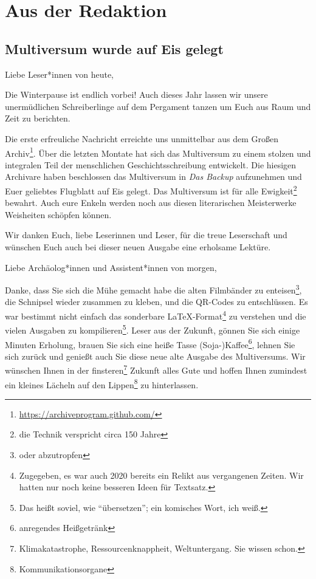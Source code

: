 \documentclass[final]{multiversum}
\begin{document}
\makemultititle
%

\section{Aus der Redaktion}
\subsection{Multiversum wurde auf Eis gelegt}
Liebe Leser*innen von heute, 

Die Winterpause ist endlich vorbei! Auch dieses Jahr lassen wir unsere unermüdlichen Schreiberlinge auf dem Pergament tanzen um Euch aus Raum und Zeit zu berichten. 

Die erste erfreuliche Nachricht erreichte uns unmittelbar aus dem Großen Archiv\footnote{\url{https://archiveprogram.github.com/}}. Über die letzten Montate hat sich das Multiversum zu einem stolzen und integralen Teil der menschlichen Geschichtsschreibung entwickelt. Die hiesigen Archivare haben beschlossen das Multiversum in \textit{Das Backup} aufzunehmen und Euer geliebtes Flugblatt auf Eis gelegt. 
Das Multiversum ist für alle Ewigkeit\footnote{die Technik verspricht circa 150 Jahre} bewahrt. Auch eure Enkeln werden noch aus diesen literarischen Meisterwerke Weisheiten schöpfen können.

Wir danken Euch, liebe Leserinnen und Leser, für die treue Leserschaft und wünschen Euch auch bei dieser neuen Ausgabe eine erholsame Lektüre.

\vspace{1em}\noindent
Liebe Archäolog*innen und Assistent*innen von morgen,

Danke, dass Sie sich die Mühe gemacht habe die alten Filmbänder zu enteisen\footnote{oder abzutropfen}, die Schnipsel wieder zusammen zu kleben, und die QR-Codes zu entschlüssen.
Es war bestimmt nicht einfach das sonderbare LaTeX-Format\footnote{Zugegeben, es war auch 2020 bereits ein Relikt aus vergangenen Zeiten. Wir hatten nur noch keine besseren Ideen für Textsatz.} zu verstehen und die vielen Ausgaben zu kompilieren\footnote{ Das heißt soviel, wie \enquote{übersetzen}; ein komisches Wort, ich weiß.}.
Leser aus der Zukunft, gönnen Sie sich einige Minuten Erholung, brauen Sie sich eine heiße Tasse (Soja-)Kaffee\footnote{anregendes Heißgetränk}, lehnen Sie sich zurück und genießt auch Sie diese neue alte Ausgabe des Multiversums.
Wir wünschen Ihnen in der finsteren\footnote{ Klimakatastrophe, Ressourcenknappheit, Weltuntergang. Sie wissen schon.} Zukunft alles Gute und hoffen Ihnen zumindest ein kleines Lächeln auf den Lippen\footnote{Kommunikationsorgane} zu hinterlassen. 
\end{document}

